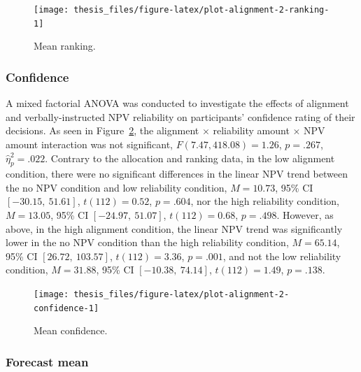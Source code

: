 \documentclass[a4paper, nobind, dvipsnames]{templates/ociamthesis}
\theoremstyle{definition}
\theoremstyle{definition}
\theoremstyle{definition}
\theoremstyle{definition}
\theoremstyle{remark}
\begin{document}
\begin{figure}
\texttt{[image: thesis\_files/figure-latex/plot-alignment-2-ranking-1]} \caption{Mean ranking.}\label{fig:plot-alignment-2-ranking}
\end{figure}

\hypertarget{confidence}{%
\subsubsection{Confidence}\label{confidence}}

A mixed factorial ANOVA was conducted to investigate the effects of alignment
and verbally-instructed NPV reliability on participants' confidence rating of
their decisions. As seen in Figure~\ref{fig:plot-alignment-2-confidence}, the
alignment \(\times\) reliability amount \(\times\) NPV amount interaction was not
significant,
\(F(7.47, 418.08) = 1.26\), \(p = .267\), \(\hat{\eta}^2_p = .022\).
Contrary to the allocation and ranking data, in
the low alignment condition, there were no significant differences in the linear
NPV trend between the no NPV condition and low reliability condition,
\(M = 10.73\), 95\% CI \([-30.15,~51.61]\), \(t(112) = 0.52\), \(p = .604\), nor the high
reliability condition, \(M = 13.05\), 95\% CI \([-24.97,~51.07]\), \(t(112) = 0.68\), \(p = .498\).
However, as above, in the high alignment condition, the linear NPV trend was
significantly lower in the no NPV condition than the high reliability condition,
\(M = 65.14\), 95\% CI \([26.72,~103.57]\), \(t(112) = 3.36\), \(p = .001\), and not the low
reliability condition, \(M = 31.88\), 95\% CI \([-10.38,~74.14]\), \(t(112) = 1.49\), \(p = .138\).



\begin{figure}
\texttt{[image: thesis\_files/figure-latex/plot-alignment-2-confidence-1]} \caption{Mean confidence.}\label{fig:plot-alignment-2-confidence}
\end{figure}

\hypertarget{forecast-mean}{%
\subsubsection{Forecast mean}\label{forecast-mean}}
\end{document}
